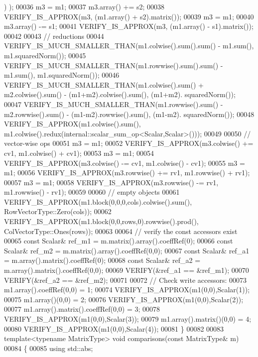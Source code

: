 \begin{DoxyCode}
      ) );
00036   m3 = m1;
00037   m3.array() += s2;
00038   VERIFY\_IS\_APPROX(m3, (m1.array() + s2).matrix());
00039   m3 = m1;
00040   m3.array() -= s1;
00041   VERIFY\_IS\_APPROX(m3, (m1.array() - s1).matrix());
00042 
00043   \textcolor{comment}{// reductions}
00044   VERIFY\_IS\_MUCH\_SMALLER\_THAN(m1.colwise().sum().sum() - m1.sum(), m1.squaredNorm());
00045   VERIFY\_IS\_MUCH\_SMALLER\_THAN(m1.rowwise().sum().sum() - m1.sum(), m1.squaredNorm());
00046   VERIFY\_IS\_MUCH\_SMALLER\_THAN(m1.colwise().sum() + m2.colwise().sum() - (m1+m2).colwise().sum(), (m1+m2).
      squaredNorm());
00047   VERIFY\_IS\_MUCH\_SMALLER\_THAN(m1.rowwise().sum() - m2.rowwise().sum() - (m1-m2).rowwise().sum(), (m1-m2).
      squaredNorm());
00048   VERIFY\_IS\_APPROX(m1.colwise().sum(), m1.colwise().redux(internal::scalar\_sum\_op<Scalar,Scalar>()));
00049 
00050   \textcolor{comment}{// vector-wise ops}
00051   m3 = m1;
00052   VERIFY\_IS\_APPROX(m3.colwise() += cv1, m1.colwise() + cv1);
00053   m3 = m1;
00054   VERIFY\_IS\_APPROX(m3.colwise() -= cv1, m1.colwise() - cv1);
00055   m3 = m1;
00056   VERIFY\_IS\_APPROX(m3.rowwise() += rv1, m1.rowwise() + rv1);
00057   m3 = m1;
00058   VERIFY\_IS\_APPROX(m3.rowwise() -= rv1, m1.rowwise() - rv1);
00059   
00060   \textcolor{comment}{// empty objects}
00061   VERIFY\_IS\_APPROX(m1.block(0,0,0,cols).colwise().sum(),  RowVectorType::Zero(cols));
00062   VERIFY\_IS\_APPROX(m1.block(0,0,rows,0).rowwise().prod(), ColVectorType::Ones(rows));
00063   
00064   \textcolor{comment}{// verify the const accessors exist}
00065   \textcolor{keyword}{const} Scalar& ref\_m1 = m.matrix().array().coeffRef(0);
00066   \textcolor{keyword}{const} Scalar& ref\_m2 = m.matrix().array().coeffRef(0,0);
00067   \textcolor{keyword}{const} Scalar& ref\_a1 = m.array().matrix().coeffRef(0);
00068   \textcolor{keyword}{const} Scalar& ref\_a2 = m.array().matrix().coeffRef(0,0);
00069   VERIFY(&ref\_a1 == &ref\_m1);
00070   VERIFY(&ref\_a2 == &ref\_m2);
00071 
00072   \textcolor{comment}{// Check write accessors:}
00073   m1.array().coeffRef(0,0) = 1;
00074   VERIFY\_IS\_APPROX(m1(0,0),Scalar(1));
00075   m1.array()(0,0) = 2;
00076   VERIFY\_IS\_APPROX(m1(0,0),Scalar(2));
00077   m1.array().matrix().coeffRef(0,0) = 3;
00078   VERIFY\_IS\_APPROX(m1(0,0),Scalar(3));
00079   m1.array().matrix()(0,0) = 4;
00080   VERIFY\_IS\_APPROX(m1(0,0),Scalar(4));
00081 \}
00082 
00083 \textcolor{keyword}{template}<\textcolor{keyword}{typename} MatrixType> \textcolor{keywordtype}{void} comparisons(\textcolor{keyword}{const} MatrixType& m)
00084 \{
00085   \textcolor{keyword}{using} std::abs;

\end{DoxyCode}
